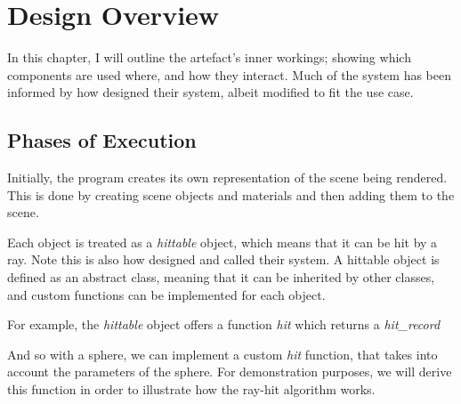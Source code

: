 \documentclass[../main.tex]{subfiles}
\begin{document}
\section{Design Overview}
In this chapter, I will outline the artefact's inner workings; showing which components are used where, and how they interact. 
Much of the system has been informed by how \cite{pharrPhysicallyBasedRendering2016} designed their system, albeit modified to fit the use case.

\subsection{Phases of Execution}

Initially, the program creates its own representation of the scene being rendered. This is done by creating scene objects and materials
and then adding them to the scene.

Each object is treated as a \textit{hittable} object, which means that it can be hit by a ray. Note this is also how \cite{petershirleytrevordavidblackstevehollaschRayTracingOne}
designed and called their system. A hittable object is defined as an abstract class, meaning that it can be inherited by other classes, and custom functions can be implemented 
for each object.

For example, the \textit{hittable} object offers a function \textit{hit} which returns a \textit{hit\_record}

And so with a sphere, we can implement a custom \textit{hit} function, that takes into account the parameters of the sphere.
For demonstration purposes, we will derive this function in order to illustrate how the ray-hit algorithm works.
\end{document}

